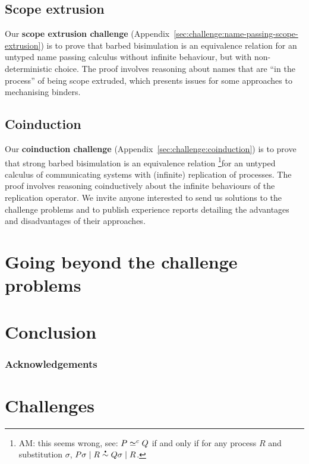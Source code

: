 \documentclass[runningheads]{llncs}
\begin{document}
\subsection{Scope extrusion}
Our \textbf{scope extrusion challenge} (Appendix~\ref{sec:challenge:name-passing-scope-extrusion}) is to prove that barbed bisimulation is an equivalence relation for an untyped name passing calculus without infinite behaviour, but with non-deterministic choice.
The proof involves reasoning about names that are ``in the process'' of being scope extruded, which presents issues for some approaches to mechanising binders.

\subsection{Coinduction}
Our \textbf{coinduction challenge} (Appendix~\ref{sec:challenge:coinduction}) is to prove that strong barbed bisimulation is an equivalence relation \footnote{AM: this seems wrong, see:  \( P \simeq^c Q \) if and only if for any process \( R \) and substitution \( \sigma \), \( \sbbisim{\Ppar{\applysubst{\sigma}{P}}{R}}{\Ppar{\applysubst{\sigma}{Q}}{R}} \).}for an untyped calculus of communicating systems with (infinite) replication of processes.
The proof involves reasoning coinductively about the infinite behaviours of the replication operator.
We invite anyone interested to send us solutions to the challenge problems and to publish experience reports detailing the advantages and disadvantages of their approaches.

\section{Going beyond the challenge problems}

\section{Conclusion}

\subsubsection*{Acknowledgements}

\appendix
\section{Challenges}




\end{document}
